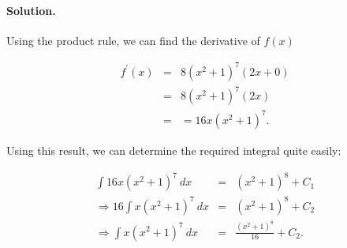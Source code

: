 

\paragraph{Solution.}

Using the product rule, we can find the derivative of $f\left(x\right)$

\begin{eqnarray*}
	f^\prime\left(x\right)&=&8\left(x^2+1\right)^7\left(2x+0\right)\\
	&=&8\left(x^2+1\right)^7\left(2x\right)\\
	&=&=16x\left(x^2+1\right)^7.
\end{eqnarray*}

Using this result, we can determine the required integral quite easily:

\begin{eqnarray*}
	\int16x\left(x^2+1\right)^7~dx&=&\left(x^2+1\right)^8+C_1\\
	\Rightarrow16\int x\left(x^2+1\right)^7~dx&=&\left(x^2+1\right)^8+C_2\\
	\Rightarrow\int x\left(x^2+1\right)^7~dx&=&\frac{\left(x^2+1\right)^8}{16}+C_2.
\end{eqnarray*}
